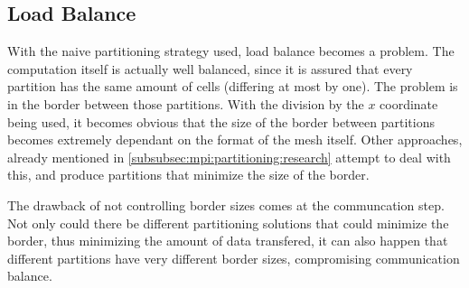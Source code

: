 \subsection{Load Balance}
\label{subsec:mpi:load}

With the naive partitioning strategy used, load balance becomes a problem. The computation itself is actually well balanced, since it is assured that every partition has the same amount of cells (differing at most by one). The problem is in the border between those partitions. With the division by the $x$ coordinate being used, it becomes obvious that the size of the border between partitions becomes extremely dependant on the format of the mesh itself. Other approaches, already mentioned in \cref{subsubsec:mpi:partitioning:research} attempt to deal with this, and produce partitions that minimize the size of the border.

The drawback of not controlling border sizes comes at the communcation step. Not only could there be different partitioning solutions that could minimize the border, thus minimizing the amount of data transfered, it can also happen that different partitions have very different border sizes, compromising communication balance.
